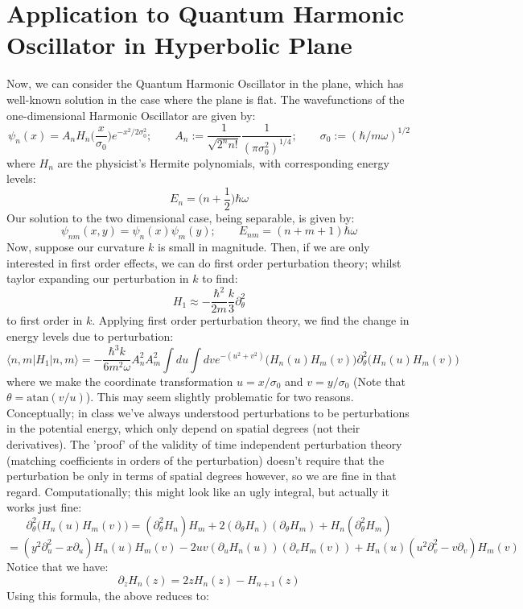 \documentclass[12pt]{article}
\begin{document}
\section{Application to Quantum Harmonic Oscillator in Hyperbolic Plane}
Now, we can consider the Quantum Harmonic Oscillator in the plane, which has well-known solution in the case where the plane is flat. The wavefunctions of the one-dimensional Harmonic Oscillator are given by: 
$$\psi_n(x) = A_n H_n \bigg( \frac{x}{\sigma_0}\bigg) e^{-x^2/2\sigma_0^2};\qquad A_n := \frac{1}{\sqrt{2^n n!}} \frac{1}{(\pi \sigma_0^2)^{1/4}};\qquad \sigma_0 := (\hbar/m\omega)^{1/2} $$
where $H_n$ are the physicist's Hermite polynomials, with corresponding energy levels:
$$E_n = \bigg( n + \frac{1}{2} \bigg) \hbar \omega$$
Our solution to the two dimensional case, being separable, is given by:
$$\psi_{nm}(x,y) = \psi_n(x) \psi_m(y); \qquad E_{nm} = (n + m + 1) \hbar \omega$$
Now, suppose our curvature $k$ is small in magnitude. Then, if we are only interested in first order effects, we can do first order perturbation theory; whilst taylor expanding our perturbation in $k$ to find:
$$H_1 \approx -\frac{\hbar^2}{2m} \frac{k}{3} \partial_{\theta}^2$$
to first order in $k$. Applying first order perturbation theory, we find the change in energy levels due to perturbation:
$$\langle n,m | H_1 | n,m \rangle = -\frac{\hbar^3 k }{6m^2 \omega} A_n^2 A_m^2 \int du \int dv e^{-(u^2 + v^2)} \bigg(H_n( u ) H_m (v )\bigg) \partial_\theta^2 \bigg(H_n( u) H_m (v)\bigg) $$
where we make the coordinate transformation $u = x/\sigma_0$ and $v = y/\sigma_0$ (Note that $\theta = \text{atan} (v/u)$). This may seem slightly problematic for two reasons. Conceptually; in class we've always understood perturbations to be perturbations in the potential energy, which only depend on spatial degrees (not their derivatives). The 'proof' of the validity of time independent perturbation theory (matching coefficients in orders of the perturbation) doesn't require that the perturbation be only in terms of spatial degrees however, so we are fine in that regard. Computationally; this might look like an ugly integral, but actually it works just fine:
$$\partial_\theta^2 \bigg( H_n(u) H_m(v) \bigg) = (\partial_\theta^2 H_n) H_m + 2(\partial_\theta H_n) (\partial_\theta H_m) + H_n (\partial_\theta^2 H_m)$$
$$ = (y^2 \partial_u^2 -x \partial_u)H_n(u) H_m(v) -2uv (\partial_u H_n(u))(\partial_v H_m(v)) + H_n(u)(u^2 \partial_v^2 - v \partial_v)H_m(v)$$
Notice that we have:
$$\partial_z H_n(z) = 2z H_n(z) - H_{n+1}(z)$$
Using this formula, the above reduces to:
\end{document}
